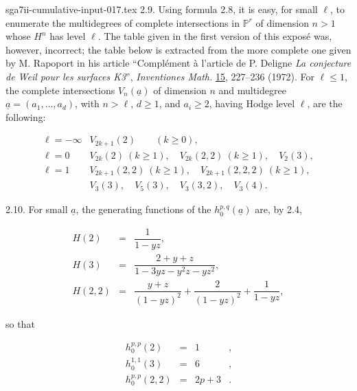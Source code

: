 \begin{filecontents*}{sga7ii-cumulative-input-017.tex}
2.9. Using formula 2.8, it is easy, for small $\ell$, to enumerate the
multidegrees of complete intersections in $\mathbb P^r$ of dimension
$n>1$ whose $H^n$ has level $\ell$.  The table given in the first version
of this exposé was, however, incorrect; the table below is extracted from
the more complete one given by M. Rapoport in his article
``Complément à l'article de P. Deligne \emph{La conjecture de Weil pour
les surfaces K3}'', \emph{Inventiones Math.} \underline{15}, 227--236
(1972).  For $\ell\leq1$, the complete intersections
$V_n(\underline a)$ of dimension $n$ and multidegree
$\underline a=(a_1,\ldots,a_d)$, with $n>\ell$, $d\geq1$, and $a_i\geq2$,
having Hodge level $\ell$, are the following:


\begin{equation*}
\begin{array}{ll}
\ell=-\infty & V_{2k+1}(2) \qquad (k\geq0),\\[2ex]
\ell=0 & V_{2k}(2)\ (k\geq1),\quad
          V_{2k}(2,2)\ (k\geq1),\quad V_2(3),\\[2ex]
\ell=1 & V_{2k+1}(2,2)\ (k\geq1),\quad
          V_{2k+1}(2,2,2)\ (k\geq1),\\
& V_3(3),\quad V_5(3),\quad V_3(3,2),\quad V_3(4).
\end{array}
\end{equation*}

2.10. For small $\underline a$, the generating functions of the
$h_0^{p,q}(\underline a)$ are, by 2.4,

\begin{equation*}
\begin{array}{rcl}
H(2)&=&\dfrac{1}{1-yz},\\[3ex]
H(3)&=&\dfrac{2+y+z}{1-3yz-y^2z-yz^2},\\[3ex]
H(2,2)&=&\dfrac{y+z}{(1-yz)^2}
          +\dfrac{2}{(1-yz)^2}+\dfrac{1}{1-yz},
\end{array}
\end{equation*}

so that

\begin{equation*}
\begin{array}{rcll}
h_0^{p,p}(2)&=&1&,\\[2ex]
h_0^{1,1}(3)&=&6&,\\[2ex]
h_0^{p,p}(2,2)&=&2p+3&.
\end{array}
\end{equation*}


\end{filecontents*}
